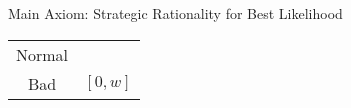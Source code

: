 \documentclass[usenames,dvipsnames,aspectratio=169,11pt, envcountsect, handout]{beamer}
\begin{document}
\begin{frame}[noframenumbering]{Main Axiom: Strategic Rationality for Best Likelihood}
\begin{table}[H]
\begin{minipage}{0.4\textwidth}
\begin{tabular}{c | c}
				{\color{blue}Normal} &                                                                        \\
				Bad                  & \( \left[0, w \right] \)                                               \\
			\end{tabular}
			\vspace{0.5cm} %
		\end{minipage} %
	\end{table}

	\begin{flushright}
		\hyperlink{srblapp}{}
	\end{flushright}

\end{frame}
\end{document}
